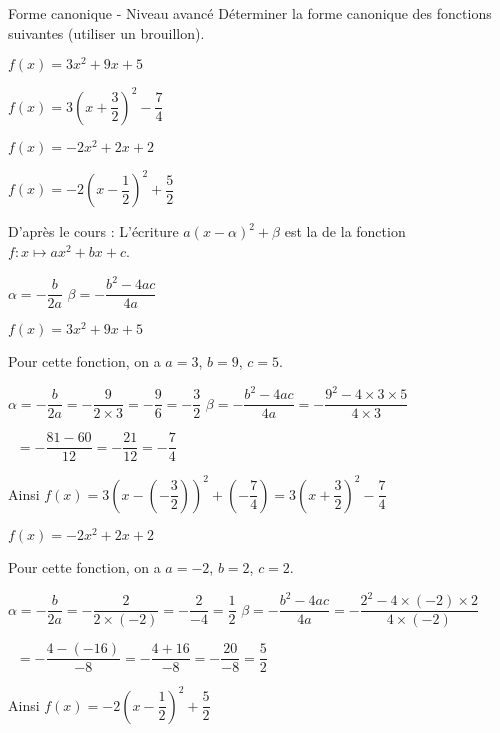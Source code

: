 \begin{EXO}{Forme canonique - Niveau avancé}{}
 Déterminer la forme canonique des fonctions suivantes (utiliser un brouillon). 
\begin{tcbenumerate}[2]
\tcbitem $f(x) = 3x^2+9x+5$
\begin{crep}
$f(x) = 3(x + \dfrac{3}{2})^2 - \dfrac{7}{4}$
\end{crep}
\tcbitem $f(x) = -2x^2+2x+2$
\begin{crep}
$f(x) = -2(x - \dfrac{1}{2})^2 + \dfrac{5}{2}$
\end{crep}
\end{tcbenumerate}

\exocorrection

D'après le cours : 
L'écriture $a(x-\alpha)^{2} +\beta$ est la de la fonction $f:x\mapsto ax^{2} + bx + c$.
    
    \begin{tcbenumerate}[2]
        \tcbitem[halign=center] $\alpha = -\dfrac{b}{2a}$
        \tcbitem[halign=center] $\beta = -\dfrac{b^2-4ac}{4a}$
    \end{tcbenumerate}
    
\begin{tcbenumerate}[1]
\tcbitem[boxrule=0.4pt,colframe=black,halign=left] $f(x) = 3x^2+9x+5$

Pour cette fonction, on a $a=3$, $b=9$, $c=5$.

\begin{tcbenumerate}[2][1][alph]
    \tcbitem[halign=center] $\alpha = -\dfrac{b}{2a} = -\dfrac{9}{2 \times 3} = -\dfrac{9}{6} = -\dfrac{3}{2}$
    \tcbitem[halign=center] $\beta = -\dfrac{b^2-4ac}{4a} = -\dfrac{9^2-4 \times 3 \times 5}{4 \times 3}$
    
    $\phantom{\beta}= -\dfrac{81-60}{12} = -\dfrac{21}{12} = -\dfrac{7}{4}$
\end{tcbenumerate}

Ainsi $f(x) = 3(x - (-\dfrac{3}{2}))^2 + (-\dfrac{7}{4}) = 3(x + \dfrac{3}{2})^2 - \dfrac{7}{4}$

\tcbitem[boxrule=0.4pt,colframe=black,halign=left] $f(x) = -2x^2+2x+2$

Pour cette fonction, on a $a=-2$, $b=2$, $c=2$.

\begin{tcbenumerate}[2][1][alph]
    \tcbitem[halign=center] $\alpha = -\dfrac{b}{2a} = -\dfrac{2}{2 \times (-2)} = -\dfrac{2}{-4} = \dfrac{1}{2}$
    \tcbitem[halign=center] $\beta = -\dfrac{b^2-4ac}{4a} = -\dfrac{2^2-4 \times (-2) \times 2}{4 \times (-2)}$
    
    $\phantom{\beta}= -\dfrac{4-(-16)}{-8} = -\dfrac{4+16}{-8} = -\dfrac{20}{-8} = \dfrac{5}{2}$
\end{tcbenumerate}

Ainsi $f(x) = -2(x - \dfrac{1}{2})^2 + \dfrac{5}{2}$
\end{tcbenumerate}
\end{EXO}